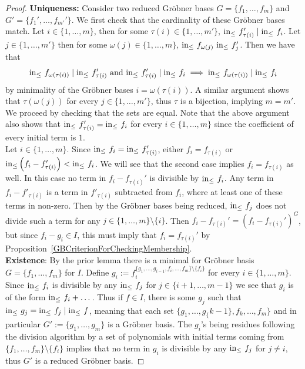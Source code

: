 \begin{proof}
    \textbf{Uniqueness:} Consider two reduced Gröbner bases $G=\{f_1,\dots,f_m\}$ and $G' = \{f_1',\dots,f_{m'}'\}$. We first check that the cardinality of these Gröbner bases match. Let $i\in\{1,\dots,m\}$, then for some $\tau(i)\in\{1,\dots,m'\}$, $\mathrm{in}_\leq\ f'_{\tau(i)}\mid \mathrm{in}_\leq\ f_i$. Let $j\in \{1,\dots,m'\}$ then for some $\omega(j)\in \{1,\dots,m\}$, $\mathrm{in}_\leq \ f_{\omega(j)} \ \mathrm{in}_\leq\ f'_{j}$. Then we have that  
    $$\inn\ f_{\omega(\tau(i))}\mid \inn\ f'_{\tau(i)} \text{ and }    \inn\ f'_{\tau(i)} \mid \inn\ f_{i} \implies \inn\ f_{\omega(\tau(i))} \mid \inn\ f_i$$
    by minimality of the Gröbner bases $i = \omega(\tau(i))$. A similar argument shows that $\tau(\omega(j))$ for every $j\in\{1,\dots,m'\}$, thus $\tau$ is a bijection, implying $m=m'$. We proceed by checking that the sets are equal. Note that the above argument also shows that $\mathrm{in}_\leq\ f'_{\tau(i)} = \mathrm{in}_\leq\ f_i$ for every $i\in\{1,\dots,m\}$ since the coefficient of every initial term is $1$.\\
    Let $i\in\{1,\dots,m\}$. Since $\mathrm{in}_\leq\ f_i=\mathrm{in}_\leq\ f_{\tau(i)}'$, either $f_i=f_{\tau(i)}$ or $\mathrm{in}_\leq\left( f_i-f_{\tau(i)}'\right)<\mathrm{in}_\leq\ f_i$. We will see that the second case implies $f_i=f_{\tau(i)}$ as well. In this case no term in $f_i-f_{\tau(i)}'$ is divisible by $\mathrm{in}_\leq\ f_i$. Any term in $f_i-f'_{\tau(i)}$ is a term in $f'_{\tau(i)}$ subtracted from $f_i$, where at least one of these terms in non-zero. Then by the Gröbner bases being reduced, $\mathrm{in}_\leq\ f_j$ does not divide such a term for any $j\in\{1,\dots,m\}\setminus\{i\}$. Then $f_i-f_{\tau(i)}' = \left(f_i-f_{\tau(i)}'\right)^G$, but since $f_i-g_i \in I$, this must imply that $f_i=f_{\tau(i)}'$ by Proposition~\ref{GBCriterionForCheckingMembership}.\\ 
    \textbf{Existence}:
    By the prior lemma there is a minimal for Gröbner basis $G=\{f_1,\dots,f_m\}$ for $I$. Define $g_i := f_i^{\{g_1,\dots,g_{i-1},f_i,\dots,f_m\}\setminus\{f_i\}}$ for every $i\in\{1,\dots,m\}$. Since $\mathrm{in}_\leq\ f_i$ is divisible by any $\mathrm{in}_\leq\ f_j$ for $j\in\{i+1,\dots,m-1\}$ we see that $g_i$ is of the form $\mathrm{in}_\leq\ f_i+\dots$. Thus if $f\in I$, there is some $g_j$ such that $\inn\ g_j = \inn\ f_j\mid \inn\ f$, meaning that each set $\{g_1,\dots,g_\{k-1\},f_k,\dots,f_m\}$ and in particular $G' := \{g_1,\dots,g_m\}$ is a Gröbner basis. The $g_i$'s being residues following the division algorithm by a set of polynomials with initial terms coming from $\{f_1,\dots,f_m\}\setminus \{f_i\}$ implies that no term in $g_i$ is divisible by any $\mathrm{in}_\leq\ f_j$ for $j\neq i$, thus $G'$ is a reduced Gröbner basis.    
\end{proof}
